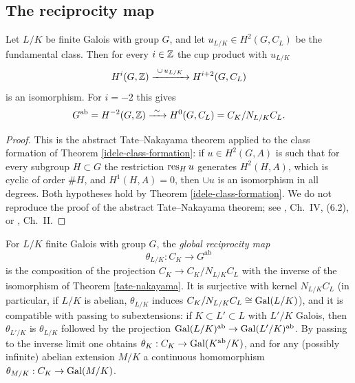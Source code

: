 \subsection{The reciprocity map}

\begin{thm}
\label{tate-nakayama}
Let $L/K$ be finite Galois with group $G$, and let $u_{L/K}\in H^2(G,C_L)$ be
the fundamental class.
Then for every $i\in{\mathbb {Z}}$ the cup product with $u_{L/K}$
$$H^i(G,\BZ)\xrightarrow{\ \cup\,u_{L/K}\ }H^{i+2}(G,C_L)$$
is an isomorphism.
For $i=-2$ this gives
$$G^{\mathrm{ab}}=H^{-2}(G,\BZ)\xrightarrow{\ \sim\ }H^0(G,C_L)=C_K/N_{L/K}C_L .$$
\end{thm}

\begin{proof}
This is the abstract Tate--Nakayama theorem applied to the class formation of
Theorem \ref{idele-class-formation}: if $u\in H^2(G,A)$ is such that for every
subgroup $H\subset G$ the restriction $\operatorname{res}_H u$ generates $H^2(H,A)$, which is
cyclic of order $\#H$, and $H^1(H,A)=0$, then $\cup u$ is an isomorphism in all
degrees.
Both hypotheses hold by Theorem \ref{idele-class-formation}.
We do not reproduce the proof of the abstract Tate--Nakayama theorem; see
\cite{Neu99}, Ch.~IV, (6.2), or \cite{Mil20}, Ch.~II.
\end{proof}

\begin{definition}
\label{global-reciprocity-map}
For $L/K$ finite Galois with group $G$, the \emph{global reciprocity map}
$$\theta_{L/K}:C_K\longrightarrow G^{\mathrm{ab}}$$
is the composition of the projection $C_K\to C_K/N_{L/K}C_L$ with the inverse of
the isomorphism of Theorem \ref{tate-nakayama}.
It is surjective with kernel $N_{L/K}C_L$ (in particular, if $L/K$ is abelian,
$\theta_{L/K}$ induces $C_K/N_{L/K}C_L\cong{\mathrm{Gal}}(L/K)$), and it is compatible
with passing to subextensions: if $K\subset L'\subset L$ with $L'/K$ Galois,
then $\theta_{L'/K}$ is $\theta_{L/K}$ followed by the projection
${\mathrm{Gal}}(L/K)^{\mathrm{ab}}\to{\mathrm{Gal}}(L'/K)^{\mathrm{ab}}$.
By passing to the inverse limit one obtains
$\theta_K:C_K\to{\mathrm{Gal}}(K^{\mathrm{ab}}/K)$, and for any (possibly infinite)
abelian extension $M/K$ a continuous homomorphism
$\theta_{M/K}:C_K\to{\mathrm{Gal}}(M/K)$.
\end{definition}

